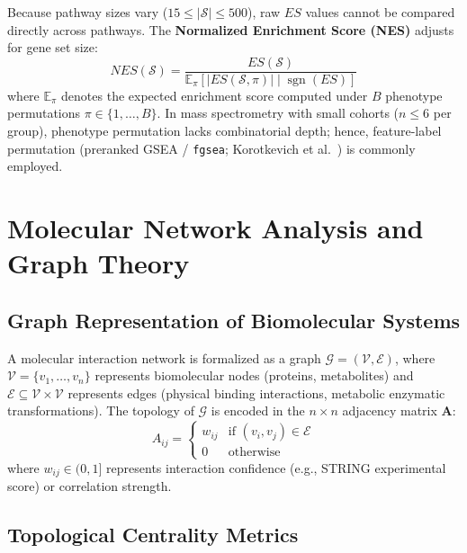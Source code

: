 \documentclass[11pt,twoside,openright]{book}
\begin{document}
Because pathway sizes vary ($15 \le |\mathcal{S}| \le 500$), raw $ES$ values cannot be compared directly across pathways. The \textbf{Normalized Enrichment Score (NES)} adjusts for gene set size:
\begin{equation}
\label{eq:gsea_nes}
NES(\mathcal{S}) = \frac{ES(\mathcal{S})}{\mathbb{E}_{\pi}\left[ |ES(\mathcal{S}, \pi)| \mid \operatorname{sgn}(ES) \right]}
\end{equation}
where $\mathbb{E}_{\pi}$ denotes the expected enrichment score computed under $B$ phenotype permutations $\pi \in \{1, \dots, B\}$. In mass spectrometry with small cohorts ($n \le 6$ per group), phenotype permutation lacks combinatorial depth; hence, feature-label permutation (preranked GSEA / \texttt{fgsea}; Korotkevich et al.~\cite{korotkevich2021fast}) is commonly employed.

\section{Molecular Network Analysis and Graph Theory}

\subsection{Graph Representation of Biomolecular Systems}

A molecular interaction network is formalized as a graph $\mathcal{G} = (\mathcal{V}, \mathcal{E})$, where $\mathcal{V} = \{v_1, \dots, v_n\}$ represents biomolecular nodes (proteins, metabolites) and $\mathcal{E} \subseteq \mathcal{V} \times \mathcal{V}$ represents edges (physical binding interactions, metabolic enzymatic transformations). The topology of $\mathcal{G}$ is encoded in the $n \times n$ adjacency matrix $\mathbf{A}$:
\begin{equation}
A_{ij} = \begin{cases} w_{ij} & \text{if } (v_i, v_j) \in \mathcal{E} \\ 0 & \text{otherwise} \end{cases}
\end{equation}
where $w_{ij} \in (0, 1]$ represents interaction confidence (e.g., STRING experimental score) or correlation strength.

\subsection{Topological Centrality Metrics}
\end{document}
